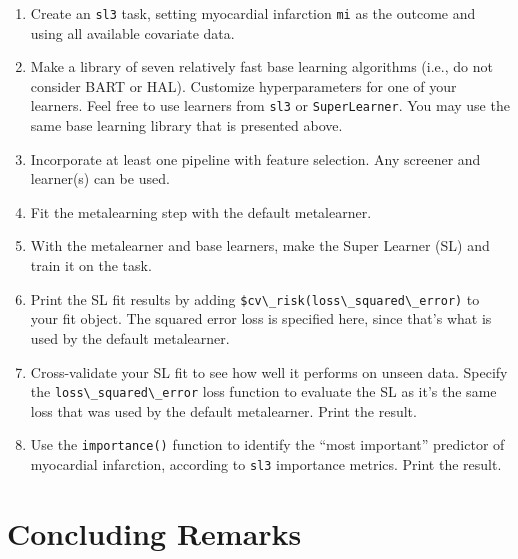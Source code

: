 \documentclass[
  12pt, krantz2,
]{krantz}
\newcommand{\passthrough}[1]{#1}
\providecommand{\tightlist}{%
  \setlength{\itemsep}{0pt}\setlength{\parskip}{0pt}}
\newcommand{\1}{\mathbbm{1}}
\theoremstyle{definition}
\theoremstyle{definition}
\theoremstyle{definition}
\theoremstyle{definition}
\theoremstyle{remark}
\begin{document}
\begin{enumerate}
\def\labelenumi{\arabic{enumi}.}
\tightlist
\item
  Create an \passthrough{\lstinline!sl3!} task, setting myocardial infarction \passthrough{\lstinline!mi!} as the outcome and
  using all available covariate data.
\item
  Make a library of seven relatively fast base learning algorithms (i.e., do
  not consider BART or HAL). Customize hyperparameters for one of your
  learners. Feel free to use learners from \passthrough{\lstinline!sl3!} or \passthrough{\lstinline!SuperLearner!}. You may
  use the same base learning library that is presented above.
\item
  Incorporate at least one pipeline with feature selection. Any screener and
  learner(s) can be used.
\item
  Fit the metalearning step with the default metalearner.
\item
  With the metalearner and base learners, make the Super Learner (SL) and
  train it on the task.
\item
  Print the SL fit results by adding \passthrough{\lstinline!$cv\_risk(loss\_squared\_error)!} to your
  fit object. The squared error loss is specified here, since that's what is
  used by the default metalearner.
\item
  Cross-validate your SL fit to see how well it performs on unseen data.
  Specify the \passthrough{\lstinline!loss\_squared\_error!} loss function to evaluate the SL as it's
  the same loss that was used by the default metalearner. Print the result.
\item
  Use the \passthrough{\lstinline!importance()!} function to identify the ``most important'' predictor of
  myocardial infarction, according to \passthrough{\lstinline!sl3!} importance metrics. Print the
  result.
\end{enumerate}

\hypertarget{concluding-remarks}{%
\section{Concluding Remarks}\label{concluding-remarks}}
\end{document}
